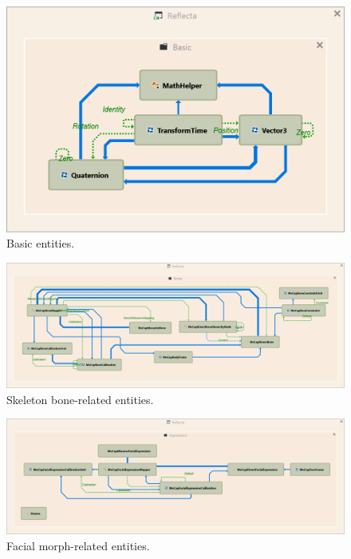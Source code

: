 \documentclass[a4paper, 12pt]{amsart}
\begin{document}
\begin{figure}[htb]
\centering
\includegraphics[width=.6\linewidth]{fig_reflecta_entity_relationships_basic}
\caption{Basic entities.}
\label{fig:reflecta_entity_relationships_basic}
\end{figure}

\begin{figure}
\vspace{100mm}
\centering
\includegraphics[width=1\linewidth]{fig_reflecta_entity_relationships_bones}
\caption{Skeleton bone-related entities.}
\label{fig:reflecta_entity_relationships_bones}
\end{figure}

\begin{figure}
\vspace{100mm}
\centering
\includegraphics[width=1\linewidth]{fig_reflecta_entity_relationships_expressions}
\caption{Facial morph-related entities.}
\label{fig:reflecta_entity_relationships_expressions}
\end{figure}
\end{document}
